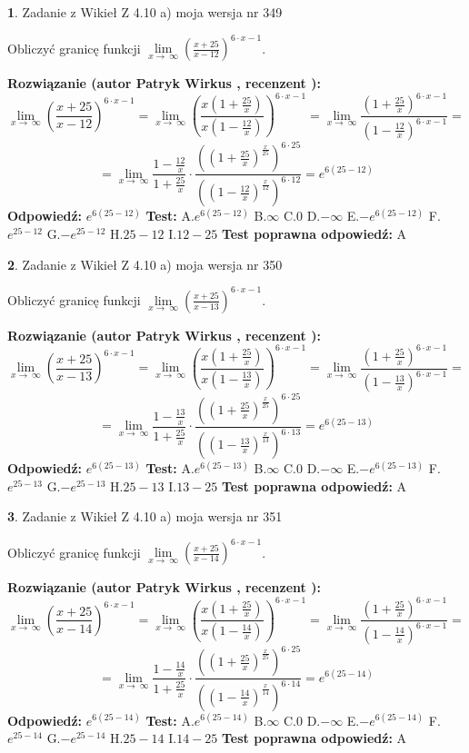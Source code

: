 \documentclass[12pt, a4paper]{article}
\theoremstyle{definition} %
\newtheorem{zad}{}
\newcommand{\zadStart}[1]{\begin{zad}#1\newline}
\newcommand{\zadStop}{\end{zad}}
\newcommand{\rozwStart}[2]{\noindent \textbf{Rozwiązanie (autor #1 , recenzent #2): }\newline}
\newcommand{\rozwStop}{\newline}
\newcommand{\odpStart}{\noindent \textbf{Odpowiedź:}\newline}
\newcommand{\odpStop}{\newline}
\newcommand{\testStart}{\noindent \textbf{Test:}\newline}
\newcommand{\testStop}{\newline}
\newcommand{\kluczStart}{\noindent \textbf{Test poprawna odpowiedź:}\newline}
\newcommand{\kluczStop}{\newline}
\begin{document}
\zadStart{Zadanie z Wikieł Z 4.10 a) moja wersja nr 349}


Obliczyć granicę funkcji  $\lim\limits_{x\to\ \infty}(\frac{x+25}{x-12})^{6\cdot x-1}$.
\zadStop
\rozwStart{Patryk Wirkus}{}
$$\lim\limits_{x\to\ \infty}(\frac{x+25}{x-12})^{6\cdot x-1} = \lim\limits_{x\to\ \infty}(\frac{x(1+\frac{25}{x})}{x(1-\frac{12}{x})})^{6\cdot x-1}=\lim\limits_{x\to\ \infty}\frac{(1+\frac{25}{x})^{6\cdot x-1}}{(1-\frac{12}{x})^{6\cdot x-1}}=$$
$$=\lim\limits_{x\to\ \infty}\frac{1-\frac{12}{x}}{1+\frac{25}{x}}\cdot\frac{((1+\frac{25}{x})^{\frac{x}{25}})^{6\cdot25}}{((1-\frac{12}{x})^{\frac{x}{12}})^{6\cdot12}}=e^{6(25-12)}$$
\rozwStop
\odpStart
$e^{6(25-12)}$
\odpStop
\testStart
A.$e^{6(25-12)}$ B.$\infty$ C.$0$ D.$-\infty$ E.$-e^{6(25-12)}$
F.$e^{25-12}$ G.$-e^{25-12}$
H.$25-12$
I.$12-25$
\testStop
\kluczStart
A
\kluczStop



\zadStart{Zadanie z Wikieł Z 4.10 a) moja wersja nr 350}


Obliczyć granicę funkcji  $\lim\limits_{x\to\ \infty}(\frac{x+25}{x-13})^{6\cdot x-1}$.
\zadStop
\rozwStart{Patryk Wirkus}{}
$$\lim\limits_{x\to\ \infty}(\frac{x+25}{x-13})^{6\cdot x-1} = \lim\limits_{x\to\ \infty}(\frac{x(1+\frac{25}{x})}{x(1-\frac{13}{x})})^{6\cdot x-1}=\lim\limits_{x\to\ \infty}\frac{(1+\frac{25}{x})^{6\cdot x-1}}{(1-\frac{13}{x})^{6\cdot x-1}}=$$
$$=\lim\limits_{x\to\ \infty}\frac{1-\frac{13}{x}}{1+\frac{25}{x}}\cdot\frac{((1+\frac{25}{x})^{\frac{x}{25}})^{6\cdot25}}{((1-\frac{13}{x})^{\frac{x}{13}})^{6\cdot13}}=e^{6(25-13)}$$
\rozwStop
\odpStart
$e^{6(25-13)}$
\odpStop
\testStart
A.$e^{6(25-13)}$ B.$\infty$ C.$0$ D.$-\infty$ E.$-e^{6(25-13)}$
F.$e^{25-13}$ G.$-e^{25-13}$
H.$25-13$
I.$13-25$
\testStop
\kluczStart
A
\kluczStop



\zadStart{Zadanie z Wikieł Z 4.10 a) moja wersja nr 351}


Obliczyć granicę funkcji  $\lim\limits_{x\to\ \infty}(\frac{x+25}{x-14})^{6\cdot x-1}$.
\zadStop
\rozwStart{Patryk Wirkus}{}
$$\lim\limits_{x\to\ \infty}(\frac{x+25}{x-14})^{6\cdot x-1} = \lim\limits_{x\to\ \infty}(\frac{x(1+\frac{25}{x})}{x(1-\frac{14}{x})})^{6\cdot x-1}=\lim\limits_{x\to\ \infty}\frac{(1+\frac{25}{x})^{6\cdot x-1}}{(1-\frac{14}{x})^{6\cdot x-1}}=$$
$$=\lim\limits_{x\to\ \infty}\frac{1-\frac{14}{x}}{1+\frac{25}{x}}\cdot\frac{((1+\frac{25}{x})^{\frac{x}{25}})^{6\cdot25}}{((1-\frac{14}{x})^{\frac{x}{14}})^{6\cdot14}}=e^{6(25-14)}$$
\rozwStop
\odpStart
$e^{6(25-14)}$
\odpStop
\testStart
A.$e^{6(25-14)}$ B.$\infty$ C.$0$ D.$-\infty$ E.$-e^{6(25-14)}$
F.$e^{25-14}$ G.$-e^{25-14}$
H.$25-14$
I.$14-25$
\testStop
\kluczStart
A
\kluczStop
\end{document}
